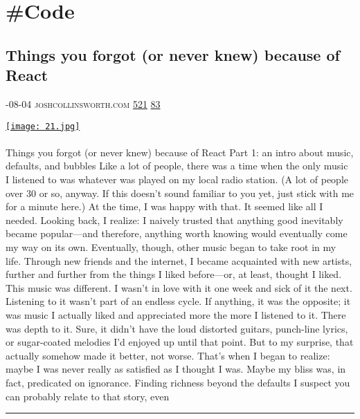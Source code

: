 \documentclass[10pt,a4paper]{article}
\begin{document}
\newpage
\section{\#Code}

\begin{multicols}{2}

\noindent\begin{minipage}{\linewidth}
\subsection{Things you forgot (or never knew) because of React}
\textsc{\footnotesize
{\scriptsize\faCalendar}-08-04 
{\scriptsize\faGlobe}\space 
joshcollinsworth.com 
{\scriptsize\faThumbsOUp}\space 
\href{http://news.ycombinator.com/item?id=37131802\&utm\_term=comment}{521} 
{\scriptsize\faComments}\space 
\href{http://news.ycombinator.com/item?id=37131802\&utm\_term=comment}{83} 
}
\par\medskip\noindent
\href{https://joshcollinsworth.com/blog/antiquated-react?utm\_source=hackernewsletter\&utm\_medium=email\&utm\_term=code}{
    \texttt{[image: 21.jpg]}
}
\end{minipage}
\paragraph{}
Things you forgot (or never knew) because of React
Part 1: an intro about music, defaults, and bubbles
Like a lot of people, there was a time when the only music I listened to was whatever was played on my local radio station. (A lot of people over 30 or so, anyway. If this doesn’t sound familiar to you yet, just stick with me for a minute here.) At the time, I was happy with that. It seemed like all I needed.
Looking back, I realize: I naively trusted that anything good inevitably became popular—and therefore, anything worth knowing would eventually come my way on its own.
Eventually, though, other music began to take root in my life. Through new friends and the internet, I became acquainted with new artists, further and further from the things I liked before—or, at least, thought I liked.
This music was different. I wasn’t in love with it one week and sick of it the next. Listening to it wasn’t part of an endless cycle.
If anything, it was the opposite; it was music I actually liked and appreciated more the more I listened to it. There was depth to it. Sure, it didn’t have the loud distorted guitars, punch-line lyrics, or sugar-coated melodies I’d enjoyed up until that point. But to my surprise, that actually somehow made it better, not worse.
That’s when I began to realize: maybe I was never really as satisfied as I thought I was.
Maybe my bliss was, in fact, predicated on ignorance.
Finding richness beyond the defaults
I suspect you can probably relate to that story, even
\par\noindent\textcolor{red}{\rule{\linewidth}{0.2mm}}
\vfill
\null
\noindent\begin{minipage}{\linewidth}

\end{minipage}
\end{multicols}
\end{document}
